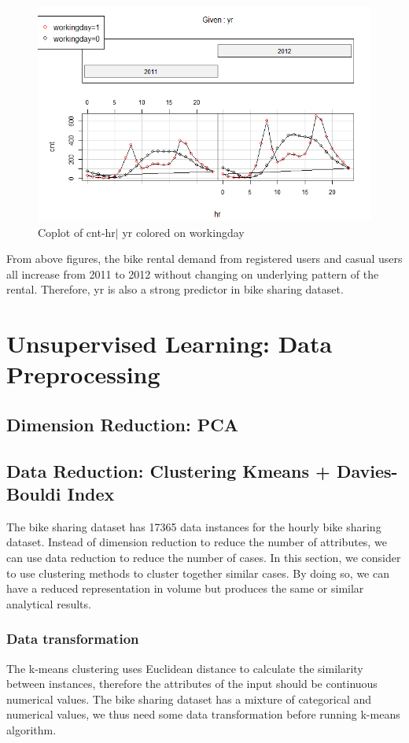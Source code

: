 \documentclass[12pt]{article}
\begin{document}
		\begin{figure}[H]
			\centering
			\includegraphics[scale=.8]{figures/cnt_year.png}
			\caption{Coplot of cnt-hr$|$ yr colored on workingday}
		\end{figure}
    From above figures, the bike rental demand from registered users and casual users all increase from 2011 to 2012 without changing on underlying pattern of the rental. Therefore, yr is also a strong predictor in bike sharing dataset.
	\section{Unsupervised Learning: Data Preprocessing}
	\subsection{Dimension Reduction: PCA }
	\label{sec:dimension-reduction}
	
	\subsection{Data Reduction: Clustering Kmeans + Davies-Bouldi Index}
	\label{data-reduction}
	
	The bike sharing dataset has  17365 data instances for the hourly bike sharing dataset. Instead of dimension reduction to reduce the number of attributes, we can use data reduction to reduce the number of cases. In this section, we consider to use clustering methods to cluster together similar cases. By doing so, we can have a reduced representation in volume but produces the same or similar analytical results.
	\subsubsection{Data transformation}
	The k-means clustering uses Euclidean distance to calculate the similarity between instances, therefore the attributes of the input should be continuous numerical values. The bike sharing dataset has a mixture of categorical and numerical values, we thus need some data transformation before running k-means algorithm.
	
\end{document}
